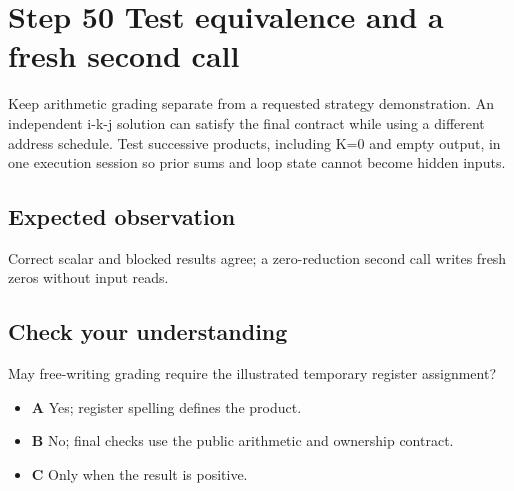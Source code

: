 \section{Step 50 Test equivalence and a fresh second call}\label{matmul-s50}

Keep arithmetic grading separate from a requested strategy demonstration. An independent i-k-j solution can satisfy the final contract while using a different address schedule. Test successive products, including K=0 and empty output, in one execution session so prior sums and loop state cannot become hidden inputs.

\subsection{Expected observation}
Correct scalar and blocked results agree; a zero-reduction second call writes fresh zeros without input reads.

\subsection{Check your understanding}
May free-writing grading require the illustrated temporary register assignment?

\begin{itemize}
  \item \textbf{A} Yes; register spelling defines the product.
  \item \textbf{B} No; final checks use the public arithmetic and ownership contract.
  \item \textbf{C} Only when the result is positive.
\end{itemize}
